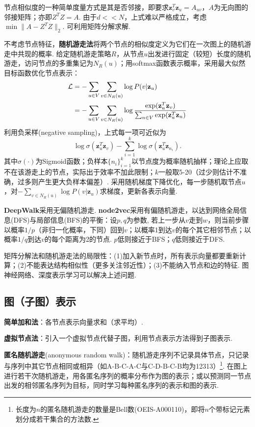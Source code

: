 \par 节点相似度的一种简单度量方式是其是否邻接，即要求$\mathbf{z}_v^T\mathbf{z}_u=A_{uv}$，$A$为无向图的邻接矩阵；亦即$Z^T Z=A$. 由于$d<<N$，上式难以严格成立，考虑$\min \|A-Z^T Z\|_2$. 可利用矩阵分解求解. 

\par 不考虑节点特征，\textbf{随机游走法}将两个节点的相似度定义为它们在一次图上的随机游走中共现的概率. 给定随机游走策略$R$，从节点$u$出发进行固定（较短）长度的随机游走，访问节点的多重集记为$N_R(u)$；用softmax函数表示概率，采用最大似然目标函数优化节点表示：
\begin{align}
\mathcal{L}&=-\sum_{u\in V}\sum_{v \in N_R(u)} \log P(v \vert \mathbf{z}_u)\notag \\
&=-\sum_{u\in V}\sum_{v \in N_R(u)}\log \frac{\exp(\mathbf{z}_u^T \mathbf{z}_v)}{\sum_{n\in V}\exp(\mathbf{z}_u^T \mathbf{z}_n)}
\end{align}
利用负采样(negative sampling)，上式每一项可近似为
\begin{equation}
    \log \sigma(\mathbf{z}_u^T \mathbf{z}_v)-\sum_{i=1}^k \log \sigma(\mathbf{z}_u^T \mathbf{z}_{n_i}).
\end{equation}
其中$\sigma(\cdot)$为Sigmoid函数；负样本$\{n_i\}_{i=1}^k$以节点度为概率随机抽样；理论上应取不在该游走上的节点，实际出于效率不加此限制；$k$一般取5-20（过少则估计不准确，过多则产生更大负样本偏差）. 采用随机梯度下降优化，每一步随机取节点$u$，对$-\sum_{v \in N_R(u)} \log P(v \vert \mathbf{z}_u)$求梯度，更新各表示向量. 

\par \textbf{DeepWalk}采用无偏随机游走. \textbf{node2vec}采用有偏随机游走，以达到网络全局信息(DFS)与局部信息(BFS)的平衡：设$p,q$为参数, 若上一步从$v$走到$w$，则当前步骤以概率$1/p$（非归一化概率，下同）回到$v$；以概率1到达$v$的每个其它相邻节点；以概率$1/q$到达$v$的每个距离为2的节点. $p$低则接近于BFS；$q$低则接近于DFS. 

\par 矩阵分解法和随机游走法的局限性：(1)加入新节点时，所有表示向量都要重新计算；(2)不能表达结构相似性（更多关注邻近性）；(3)不能纳入节点和边的特征. 图神经网络、深度表示学习可以解决上述问题. 

\subsection{图（子图）表示}
\par \textbf{简单加和法}：各节点表示向量求和（求平均）. 
\par \textbf{虚拟节点法}：引入一个虚拟节点代替子图，利用节点表示方法得到子图表示. 
\par \textbf{匿名随机游走}(anonymous random walk)：随机游走序列不记录具体节点，只记录与序列中其它节点相同或相异（如A-B-C-A-C与C-D-B-C-B均为12313）\footnote{长度为$n$的匿名随机游走的数量是Bell数(OEIS-A000110)，即将$n$个带标记元素划分成若干集合的方法数. }. 在图上进行若干次随机游走，用各匿名序列的概率分布作为图的表示；或以预测同一节点出发的相邻匿名序列为目标，同时学习每种匿名序列的表示和图的表示. 

